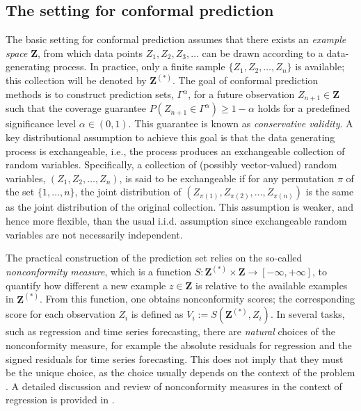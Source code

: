 \subsection{The setting for conformal prediction}\label{the-setting-for-conformal-prediction}

The basic setting for conformal prediction assumes that there exists an
\emph{example space} \(\textbf{Z}\), from which data points
\(Z_1, Z_2, Z_3, \dots\) can be drawn according to a data-generating
process. In practice, only a finite sample \(\{Z_1, Z_2, \dots, Z_n\}\) is
available; this collection will be denoted by \(\textbf{Z}^{(*)}\). The
goal of conformal prediction methods is to construct prediction sets,
\(\Gamma^{\alpha}\), for a future observation \(Z_{n+1}\in \textbf{Z}\) such
that the coverage guarantee
\(P(Z_{n+1}\in \Gamma^{\alpha}) \geq 1-\alpha\) holds for a predefined
significance level \(\alpha\in(0,1)\). This guarantee is known as
\emph{conservative validity}. A key distributional assumption to achieve this
goal is that the data generating process is exchangeable, i.e., the
process produces an exchangeable collection of random variables.
Specifically, a collection of (possibly vector-valued) random variables,
\((Z_1, Z_2, \ldots, Z_n)\), is said to be exchangeable if for any
permutation \(\pi\) of the set \(\{1,\ldots, n\}\), the joint distribution
of \((Z_{\pi(1)}, Z_{\pi(2)}, \ldots, Z_{\pi(n)})\) is the same as the
joint distribution of the original collection. This assumption is
weaker, and hence more flexible, than the usual i.i.d. assumption since
exchangeable random variables are not necessarily independent.

The practical construction of the prediction set relies on the so-called
\emph{nonconformity measure}, which is a function
\(S:\textbf{Z}^{(*)}\times \textbf{Z}\to [-\infty,+\infty]\), to quantify
how different a new example \(z\in\textbf{Z}\) is relative to the
available examples in \(\textbf{Z}^{(*)}\). From this function, one
obtains nonconformity scores; the corresponding score for each
observation \(Z_i\) is defined as \(V_i := S(\textbf{Z}^{(*)}, Z_i)\). In
several tasks, such as regression and time series forecasting, there are
\emph{natural} choices of the nonconformity measure, for example the absolute
residuals for regression and the signed residuals for time series
forecasting. This does not imply that they must be the unique choice, as
the choice usually depends on the context of the problem \citep{vovk2022}. A
detailed discussion and review of nonconformity measures in the context
of regression is provided in \citet{kato2023review}.


